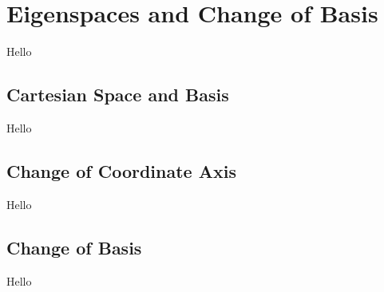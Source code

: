 \chapter{Eigenspaces and Change of Basis}
Hello

\section{Cartesian Space and Basis}
Hello

\section{Change of Coordinate Axis}
Hello

\section{Change of Basis}
Hello

